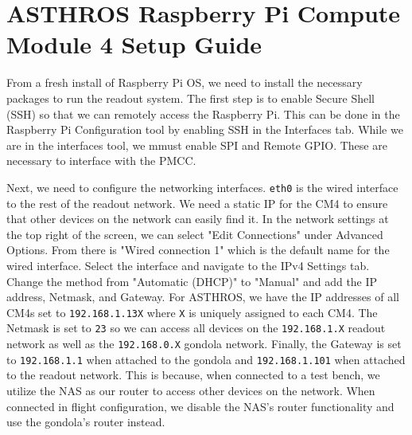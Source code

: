 \chapter{ASTHROS Raspberry Pi Compute Module 4 Setup Guide}
\label{readout/app:cm4_setup}
From a fresh install of Raspberry Pi OS, we need to install the necessary packages to run the readout system.
The first step is to enable Secure Shell (SSH) so that we can remotely access the Raspberry Pi.
This can be done in the Raspberry Pi Configuration tool by enabling SSH in the Interfaces tab.
While we are in the interfaces tool, we mmust enable SPI and Remote GPIO. 
These are necessary to interface with the PMCC.

Next, we need to configure the networking interfaces. 
\texttt{eth0} is the wired interface to the rest of the readout network. 
We need a static IP for the CM4 to ensure that other devices on the network can easily find it.
In the network settings at the top right of the screen, we can select "Edit Connections" under Advanced Options. 
From there is "Wired connection 1" which is the default name for the wired interface.
Select the interface and navigate to the IPv4 Settings tab.
Change the method from "Automatic (DHCP)" to "Manual" and add the IP address, Netmask, and Gateway.
For ASTHROS, we have the IP addresses of all CM4s set to \texttt{192.168.1.13X} where \texttt{X} is uniquely assigned to each CM4.
The Netmask is set to \texttt{23} so we can access all devices on the \texttt{192.168.1.X} readout network as well as the \texttt{192.168.0.X} gondola network.
Finally, the Gateway is set to \texttt{192.168.1.1} when attached to the gondola and \texttt{192.168.1.101} when attached to the readout network.
This is because, when connected to a test bench, we utilize the NAS as our router to access other devices on the network.
When connected in flight configuration, we disable the NAS's router functionality and use the gondola's router instead.

